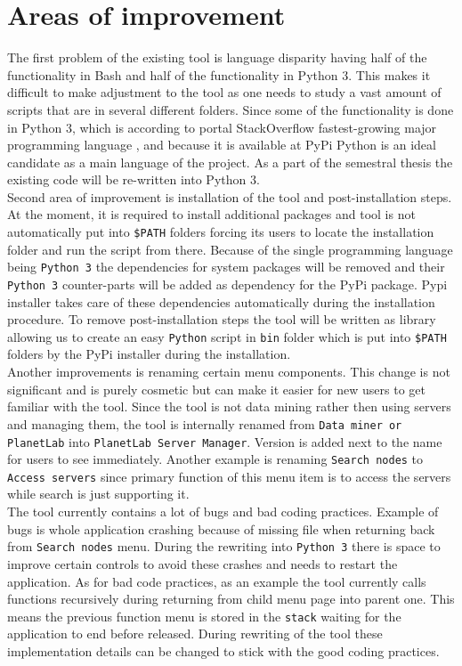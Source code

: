 \section{Areas of improvement}
The first problem of the existing tool is language disparity having half of the functionality in Bash and half of the functionality in Python 3. This makes it difficult to make adjustment to the tool as one needs to study a vast amount of scripts that are in several different folders. Since some of the functionality is done in Python 3, which is according to portal StackOverflow fastest-growing major programming language \cite{pythonfastestgrowing}, and because it is available at PyPi Python is an ideal candidate as a main language of the project. As a part of the semestral thesis the existing code will be re-written into Python 3.\\
Second area of improvement is installation of the tool and post-installation steps. At the moment, it is required to install additional packages and tool is not automatically put into \texttt{\$PATH} folders forcing its users to locate the installation folder and run the script from there. Because of the single programming language being \texttt{Python 3} the dependencies for system packages will be removed and their \texttt{Python 3} counter-parts will be added as dependency for the PyPi package. Pypi installer takes care of these dependencies automatically during the installation procedure. To remove post-installation steps the tool will be written as library allowing us to create an easy \texttt{Python} script in \texttt{bin} folder which is put into \texttt{\$PATH} folders by the PyPi installer during the installation.\\
Another improvements is renaming certain menu components. This change is not significant and is purely cosmetic but can make it easier for new users to get familiar with the tool. Since the tool is not data mining rather then using servers and managing them, the tool is internally renamed from \texttt{Data miner or PlanetLab} into \texttt{PlanetLab Server Manager}. Version is added next to the name for users to see immediately. Another example is renaming \texttt{Search nodes} to \texttt{Access servers} since primary function of this menu item is to access the servers while search is just supporting it.\\
The tool currently contains a lot of bugs and bad coding practices. Example of bugs is whole application crashing because of missing file when returning back from \texttt{Search nodes} menu. During the rewriting into \texttt{Python 3} there is space to improve certain controls to avoid these crashes and needs to restart the application. As for bad code practices, as an example the tool currently calls functions recursively during returning from child menu page into parent one. This means the previous function menu is stored in the \texttt{stack} waiting for the application to end before released. During rewriting of the tool these implementation details can be changed to stick with the good coding practices. 

